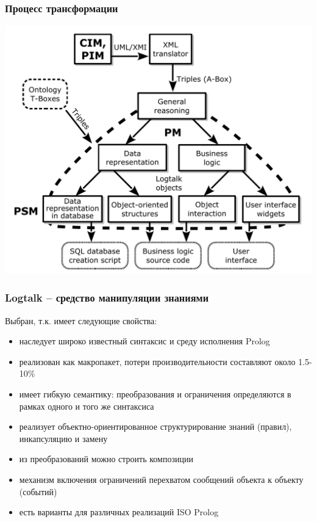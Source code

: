 \documentclass[handout]{beamer}
\begin{document}
\begin{frame}
  \frametitle{Процесс трансформации}
  \centering
  \includegraphics[width=0.9\linewidth]{architect_tree_pres-en-wo-OCL.pdf}
\end{frame}

\begin{frame}
  \frametitle{Logtalk -- средство манипуляции знаниями}
  Выбран, т.к. имеет следующие свойства:
  \begin{itemize}
  \item наследует широко известный синтаксис и среду исполнения Prolog
  \item реализован как макропакет, потери производительности составляют около 1.5-10\%
  \item имеет гибкую семантику: преобразования и ограничения определяются в рамках одного и того же синтаксиса
  \item реализует объектно-ориентированное структурирование знаний (правил), инкапсуляцию и замену
  \item из преобразований можно строить композиции
  \item механизм включения ограничений перехватом сообщений объекта к объекту (событий)
  \item есть варианты для различных реализаций ISO Prolog
  \end{itemize}
\end{frame}
\end{document}
